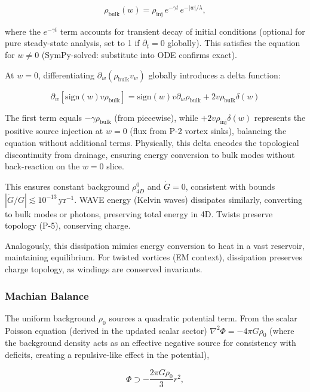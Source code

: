 \begin{equation}
\rho_{\text{bulk}}(w) = \rho_{\text{inj}} \, e^{-\gamma t} \, e^{-|w| / \lambda},
\end{equation}

where the $e^{-\gamma t}$ term accounts for transient decay of initial conditions (optional for pure steady-state analysis, set to 1 if $\partial_t = 0$ globally). This satisfies the equation for $w \neq 0$ (SymPy-solved: substitute into ODE confirms exact).

At $w=0$, differentiating $\partial_w (\rho_{\text{bulk}} v_w)$ globally introduces a delta function:

\begin{equation}
\partial_w [\text{sign}(w) v \rho_{\text{bulk}}] = \text{sign}(w) v \partial_w \rho_{\text{bulk}} + 2 v \rho_{\text{bulk}} \delta(w)    
\end{equation}

The first term equals $-\gamma \rho_{\text{bulk}}$ (from piecewise), while $+2 v \rho_{\text{inj}} \delta(w)$ represents the positive source injection at $w=0$ (flux from P-2 vortex sinks), balancing the equation without additional terms. Physically, this delta encodes the topological discontinuity from drainage, ensuring energy conversion to bulk modes without back-reaction on the $w=0$ slice.

This ensures constant background $\rho_{4D}^0$ and $\dot{G} = 0$, consistent with bounds $|\dot{G}/G| \lesssim 10^{-13} \, \mathrm{yr}^{-1}$. WAVE energy (Kelvin waves) dissipates similarly, converting to bulk modes or photons, preserving total energy in 4D. Twists preserve topology (P-5), conserving charge.

Analogously, this dissipation mimics energy conversion to heat in a vast reservoir, maintaining equilibrium. For twisted vortices (EM context), dissipation preserves charge topology, as windings are conserved invariants.

\subsubsection{Machian Balance}
The uniform background $\rho_0$ sources a quadratic potential term. From the scalar Poisson equation (derived in the updated scalar sector) $\nabla^2 \Phi = -4\pi G \rho_0$ (where the background density acts as an effective negative source for consistency with deficits, creating a repulsive-like effect in the potential),

\begin{equation}
\Phi \supset -\frac{2\pi G \rho_0}{3} r^2,
\end{equation}

